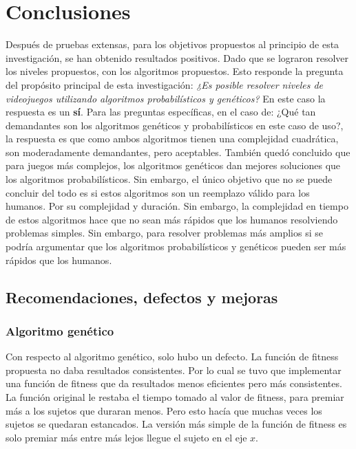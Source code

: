 \documentclass{article}
\begin{document}
\section{Conclusiones}
Después de pruebas extensas, para los objetivos propuestos al principio de esta investigación, se han obtenido resultados positivos. Dado que se lograron resolver los niveles propuestos, con los algoritmos propuestos.
Esto responde la pregunta del propósito principal de esta investigación: \textit{¿Es posible resolver niveles de videojuegos utilizando algoritmos probabilísticos y genéticos?} En este caso la respuesta es un \textbf{sí}. Para las preguntas específicas, en el caso de: ¿Qué tan demandantes son los algoritmos genéticos y probabilísticos en este caso de uso?, la respuesta es que como ambos algoritmos tienen una complejidad cuadrática, son moderadamente demandantes, pero aceptables. También quedó concluido que para juegos más complejos, los algoritmos genéticos dan mejores soluciones que los algoritmos probabilísticos. Sin embargo, el único objetivo que no se puede concluir del todo es si estos algoritmos son un reemplazo válido para los humanos. Por su complejidad y duración.
Sin embargo, la complejidad en tiempo de estos algoritmos hace que no sean más rápidos que los humanos resolviendo problemas simples. Sin embargo, para resolver problemas más amplios si se podría argumentar que los algoritmos probabilísticos y genéticos pueden ser más rápidos que los humanos.

\subsection{Recomendaciones, defectos y mejoras}
\subsubsection{Algoritmo genético}
Con respecto al algoritmo genético, solo hubo un defecto. La función de fitness propuesta no daba resultados consistentes. Por lo cual se tuvo que implementar una función de fitness que da resultados menos eficientes pero más consistentes. La función original le restaba el tiempo tomado al valor de fitness, para premiar más a los sujetos que duraran menos. Pero esto hacía que muchas veces los sujetos se quedaran estancados. La versión más simple de la función de fitness es solo premiar más entre más lejos llegue el sujeto en el eje \(x\).
\end{document}
